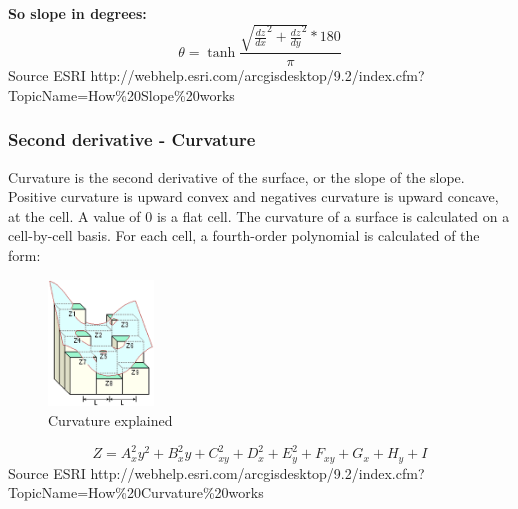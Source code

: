 \textbf{So slope in degrees:}
\begin{equation}
\theta = \tanh \frac{\sqrt{\frac{dz}{dx}^2 + \frac{dz}{dy}^2 }*180 }{\pi}
\end{equation}
Source ESRI http://webhelp.esri.com/arcgisdesktop/9.2/index.cfm?TopicName=How\%20Slope\%20works ~\cite{ahnformula}


\subsubsection{Second derivative - Curvature}

Curvature is the second derivative of the surface, or the slope of the slope. Positive curvature is upward convex and negatives curvature is upward concave, at the cell. A value of 0 is a flat cell. 
The curvature of a surface is calculated on a cell-by-cell basis. For each cell, a fourth-order polynomial is calculated of the form:

\begin{figure}[ht]
	\includegraphics[width=0.25\textwidth]{img/M_curvature.png}
	\centering
	\caption{Curvature explained}
	\label{curvature}
\end{figure}


\begin{equation}
Z = A_{x}^2 y^2 + B_{x}^2 y + C_{xy}^2 + D_{x}^2 + E_{y}^2 + F_{xy} + G_{x} + H_{y} + I
\end{equation}
Source ESRI http://webhelp.esri.com/arcgisdesktop/9.2/index.cfm?TopicName=How\%20Curvature\%20works ~\cite{ahnformula2}